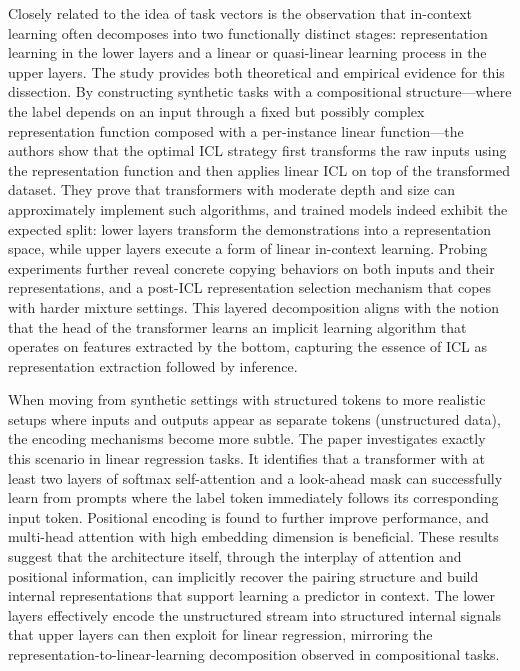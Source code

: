 \documentclass[11pt]{article}
\begin{document}
Closely related to the idea of task vectors is the observation that in-context learning often decomposes into two functionally distinct stages: representation learning in the lower layers and a linear or quasi-linear learning process in the upper layers. The study \cite{ref9} provides both theoretical and empirical evidence for this dissection. By constructing synthetic tasks with a compositional structure---where the label depends on an input through a fixed but possibly complex representation function composed with a per-instance linear function---the authors show that the optimal ICL strategy first transforms the raw inputs using the representation function and then applies linear ICL on top of the transformed dataset. They prove that transformers with moderate depth and size can approximately implement such algorithms, and trained models indeed exhibit the expected split: lower layers transform the demonstrations into a representation space, while upper layers execute a form of linear in-context learning. Probing experiments further reveal concrete copying behaviors on both inputs and their representations, and a post-ICL representation selection mechanism that copes with harder mixture settings. This layered decomposition aligns with the notion that the head of the transformer learns an implicit learning algorithm that operates on features extracted by the bottom, capturing the essence of ICL as representation extraction followed by inference.

When moving from synthetic settings with structured tokens to more realistic setups where inputs and outputs appear as separate tokens (unstructured data), the encoding mechanisms become more subtle. The paper \cite{ref62} investigates exactly this scenario in linear regression tasks. It identifies that a transformer with at least two layers of softmax self-attention and a look-ahead mask can successfully learn from prompts where the label token immediately follows its corresponding input token. Positional encoding is found to further improve performance, and multi-head attention with high embedding dimension is beneficial. These results suggest that the architecture itself, through the interplay of attention and positional information, can implicitly recover the pairing structure and build internal representations that support learning a predictor in context. The lower layers effectively encode the unstructured stream into structured internal signals that upper layers can then exploit for linear regression, mirroring the representation-to-linear-learning decomposition observed in compositional tasks.
\end{document}
